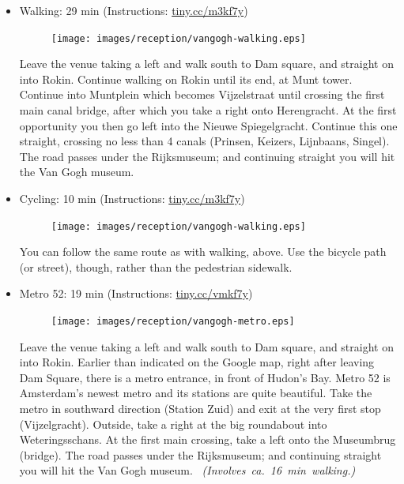 \clearpage

\begin{itemize}

\item {Walking}: \hfill 29 min (Instructions: \url{tiny.cc/m3kf7y})

\begin{minipage}{.9\textwidth}
\begin{figure}
\vspace*{-1.25\baselineskip}%
\texttt{[image: images/reception/vangogh-walking.eps]}
\end{figure}
Leave the venue taking a left and walk south to Dam square, and straight on into Rokin. Continue walking on Rokin until its end, at Munt tower. Continue into Muntplein which becomes Vijzelstraat until crossing the first main canal bridge, after which you take a right onto Herengracht. At the first opportunity you then go left into the Nieuwe Spiegelgracht. Continue this one straight, crossing no less than 4 canals (Prinsen, Keizers, Lijnbaans, Singel). The road passes under the Rijksmuseum; and continuing straight you will hit the Van Gogh museum.
\end{minipage}

\item {Cycling}: \hfill 10 min (Instructions: \url{tiny.cc/m3kf7y})

\begin{minipage}{.9\textwidth}
\begin{figure}
\vspace*{-1.25\baselineskip}%
\texttt{[image: images/reception/vangogh-walking.eps]}
\end{figure}
You can follow the same route as with walking, above. Use the bicycle path (or street), though, rather than the pedestrian sidewalk.
\vspace{3\baselineskip}
\end{minipage}

\item {Metro 52}: \hfill 19 min (Instructions: \url{tiny.cc/vmkf7y})

\begin{minipage}{.9\textwidth}
\begin{figure}
\vspace*{-1.25\baselineskip}%
\texttt{[image: images/reception/vangogh-metro.eps]}
\end{figure}
Leave the venue taking a left and walk south to Dam square, and straight on into Rokin. Earlier than indicated on the Google map, right after leaving Dam Square, there is a metro entrance, in front of Hudon's Bay. Metro 52 is Amsterdam's newest metro and its stations are quite beautiful. Take the metro in southward direction (Station Zuid) and exit at the very first stop (Vijzelgracht). Outside, take a right at the big roundabout into Weteringsschans. At the first main crossing, take a left onto the Museumbrug (bridge). The road passes under the Rijksmuseum; and continuing straight you will hit the Van Gogh museum.
~\hspace*{\fill}\mbox{\emph{(Involves ca.\ 16 min walking.)}}
\end{minipage}


\end{itemize}
